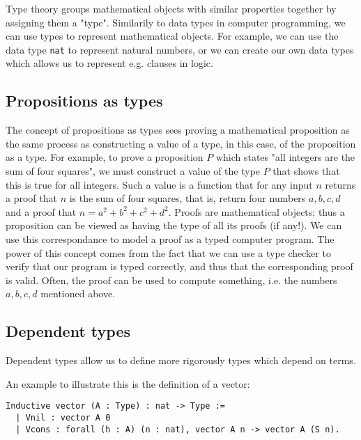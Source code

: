 Type theory groups mathematical objects with similar properties together by assigning them a "type".
Similarily to data types in computer programming, we can use types to represent mathematical
objects. For example, we can use the data type \texttt{nat} to represent natural numbers, or we can create
our own data types which allows us to represent e.g. clauses in logic.

\subsection{Propositions as types}


The concept of propositions as types sees proving a mathematical proposition
as the same process as constructing a value of a type, in this case,
of the proposition as a type.
For example, to prove a proposition $P$ which states "all integers are the sum of four squares",
we must construct a value of the type $P$ that shows that this is true for all integers.
Such a value is a function that for any input $n$ returns a proof that $n$ is the sum of four squares,
that is, return four numbers $a, b, c, d$ and a proof that $n = a^2 + b^2 + c^2 + d^2$.
Proofs are mathematical objects; thus a proposition can be viewed as having the type of all its proofs (if any!).
We can use this correspondance to model a proof as a typed computer program.
The power of this concept comes from the fact that we can use a type checker to verify that
our program is typed correctly, and thus that the corresponding proof is valid.
Often, the proof can be used to compute something, i.e. the numbers $a, b, c, d$ mentioned above.

\subsection{Dependent types}

Dependent types allow us to define more rigorously types which depend on terms.

An example to illustrate this is the definition of a vector:

\begin{minipage}{\linewidth}
\begin{lstlisting}[language=Coq, label={lst:dep_type_vec}, caption={Def. of \lstinline{vector} in Coq, using dependent types}]
Inductive vector (A : Type) : nat -> Type :=
  | Vnil : vector A 0
  | Vcons : forall (h : A) (n : nat), vector A n -> vector A (S n).
\end{lstlisting}
\end{minipage}

